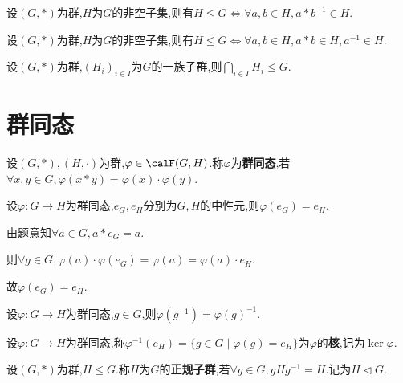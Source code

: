 \begin{prop}
    设$(G, *)$为群,$H$为$G$的非空子集,则有$H \leqslant G \iff \forall a, b \in H, a * b^{-1} \in H$.
\end{prop}

\begin{prop}
    设$(G, *)$为群,$H$为$G$的非空子集,则有$H \leqslant G \iff \forall a, b \in H, a * b \in H, a^{-1} \in H$.
\end{prop}

\begin{prop}
    设$(G, *)$为群,$(H_i)_{i \in I}$为$G$的一族子群,则$\bigcap\limits_{i \in I} H_i \leqslant G$.
\end{prop}

\section{群同态}

\begin{deff}
    设$(G, *), (H, \cdot)$为群,$\varphi \in \calF(G, H)$.称$\varphi$为\textbf{群同态},若$\forall x, y \in G, \varphi(x * y) = \varphi(x) \cdot \varphi(y)$.
\end{deff}

\begin{prop}
    设$\varphi: G \to H$为群同态,$e_G, e_H$分别为$G, H$的中性元,则$\varphi(e_G) = e_H$.
\end{prop}

\begin{prop}
    由题意知$\forall a \in G, a * e_G = a$.

    则$\forall g \in G, \varphi(a) \cdot \varphi(e_G) = \varphi(a) = \varphi(a) \cdot e_H$.

    故$\varphi(e_G)=  e_H$.
\end{prop}

\begin{prop}
    设$\varphi: G \to H$为群同态,$g \in G$,则$\varphi(g^{-1})=\varphi(g)^{-1}$.
\end{prop}

\begin{deff}
    设$\varphi: G \to H$为群同态,称$\varphi^{-1}(e_H) = \{ g \in G \mid \varphi(g) = e_H \}$为$\varphi$的\textbf{核},记为$\ker \varphi$.
\end{deff}

\begin{deff}
    设$(G, *)$为群,$H \leqslant G$.称$H$为$G$的\textbf{正规子群},若$\forall g \in G, gHg^{-1} = H$.记为$H \lhd G$.
\end{deff}

